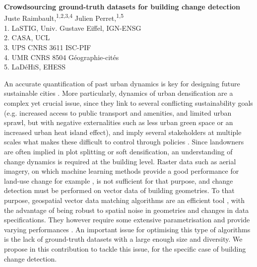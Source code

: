 \documentclass[11pt]{article}
\renewcommand{\title}[1]{{\noindent\large\bfseries#1\medskip\\}}
\renewcommand{\author}[2]{{\noindent #1 \medskip\\ \small #2 \medskip\\}}
\begin{document}
\title{Crowdsourcing ground-truth datasets for building change detection}
\author{
Juste Raimbault,\textsuperscript{1,2,3,4}
Julien Perret,\textsuperscript{1,5}
}
{
1. LaSTIG, Univ. Gustave Eiffel, IGN-ENSG\\
2. CASA, UCL\\
3. UPS CNRS 3611 ISC-PIF\\
4. UMR CNRS 8504 G{\'e}ographie-cit{\'e}s\\
5. LaDéHiS, EHESS
}





An accurate quantification of past urban dynamics is key for designing future sustainable cities \cite{batty2018inventing}. More particularly, dynamics of urban densification are a complex yet crucial issue, since they link to several conflicting sustainability goals \cite{evers2024urbanization} (e.g. increased access to public transport and amenities, and limited urban sprawl, but with negative externalities such as less urban green space or an increased urban heat island effect), and imply several stakeholders at multiple scales what makes these difficult to control through policies \cite{jehling2020densification}. Since landowners are often implied in plot splitting or soft densification, an understanding of change dynamics is required at the building level. Raster data such as aerial imagery, on which machine learning methods provide a good performance for land-use change for example \cite{khelifi2020deep}, is not sufficient for that purpose, and change detection must be performed on vector data of building geometries. To that purpose, geospatial vector data matching algorithms are an efficient tool \cite{xavier2016survey}, with the advantage of being robust to spatial noise in geometries and changes in data specifications. They however require some extensive parametrisation and provide varying performances \cite{guardiola2024optimising}. An important issue for optimising this type of algorithms is the lack of ground-truth datasets with a large enough size and diversity. We propose in this contribution to tackle this issue, for the specific case of building change detection.
\end{document}
